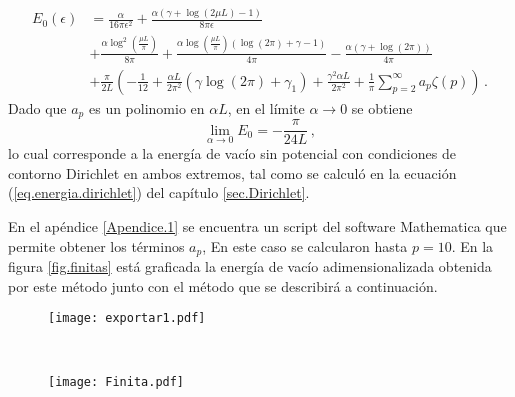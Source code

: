 \begin{align}\label{energia.vacio.final}
	E_ 0 (\epsilon )&=
		\frac{\alpha}{16  \pi  \epsilon ^2}	 
		+   \frac{
	    	\alpha ( \gamma  +  \log (2\mu L ) -1 ) }
	    	{8  \pi \epsilon } 
\\[5pt]
\nonumber
&+
	\frac{\alpha \log ^2 \left( \frac{\mu L}{\pi} \right)}{8 \pi}  +
		\frac{ 
			\alpha \log \left( \frac{\mu L}{\pi}\right)
				( \log (2 \pi ) + \gamma -1)}
			{4 \pi }  
	- \frac{\alpha (\gamma + \log (2 \pi ) )}{4 \pi}
\\[5pt]
\nonumber
&
+
	\frac{\pi}{2 L}  
			\left(
				- \frac{1}{12} +
				\frac{\alpha L}{2 \pi ^2} 
				\left(
					\gamma \log (2 \pi)
					+ \gamma _1
					\right) +
								\frac{\gamma ^2 \alpha L}{2 \pi ^2} +
								\frac{1}{\pi} \sum _{p=2} ^{\infty}
								a_p \zeta (p) 
							\right) 
\, .
\end{align}
Dado que $a _p$ es un polinomio en $\alpha L$, en el límite $\alpha \rightarrow 0$ se obtiene
\begin{equation}
\lim \limits_{\alpha \rightarrow 0} E _0 = 
		- \frac{\pi}{24 L}
\, ,
\end{equation}
lo cual corresponde a la energía de vacío sin potencial con condiciones de contorno Dirichlet en ambos extremos, tal como se calculó en la ecuación (\ref{eq.energia.dirichlet}) del capítulo \ref{sec.Dirichlet}.

En el apéndice \ref{Apendice.1} se encuentra un script del software Mathematica que permite obtener los términos $a _p$, En este caso se calcularon hasta $p=10$. En la figura \ref{fig.finitas} está graficada la energía de vacío adimensionalizada obtenida por este método junto con el método que se describirá a continuación.



\begin{figure*}[t!]
    \centering
    \begin{subfigure}[t]{0.5\textwidth}
        \centering
        \texttt{[image: exportar1.pdf]}
        \caption{}
        \label{fig.derecha}
    \end{subfigure}%
    ~ 
    \begin{subfigure}[t]{0.5\textwidth}
        \centering
        \texttt{[image: Finita.pdf]}
        \caption{}
        \label{fig.izquierda}
    \end{subfigure}
    ~
    \caption{En esta imagen se muestran dos posibles adimensionalizaciones de la energía de vacío, una vez obtenida la curva \ref{fig.izquierda} se pueden generar todas las curvas de la figura \ref{fig:vacios} haciendo los cambios de variables $\beta \rightarrow \alpha L$, $E _0 \rightarrow \frac{E _0}{\alpha}$.}
\label{fig.finitas}
\end{figure*}

